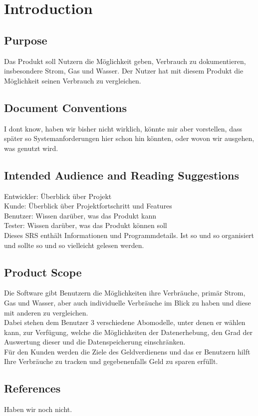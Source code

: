 \section{Introduction}
\subsection{Purpose}
Das Produkt soll Nutzern die Möglichkeit geben, Verbrauch zu dokumentieren, insbesondere Strom, Gas und Wasser. Der Nutzer hat mit diesem Produkt die Möglichkeit seinen Verbrauch zu vergleichen.
\subsection{Document Conventions}
I dont know, haben wir bisher nicht wirklich, könnte mir aber vorstellen, dass später so Systemanforderungen hier schon hin könnten, oder wovon wir ausgehen, was genutzt wird.
\subsection{Intended Audience and Reading Suggestions}
Entwickler: Überblick über Projekt\\
Kunde: Überblick über Projektfortschritt und Features\\
Benutzer: Wissen darüber, was das Produkt kann\\
Tester:  Wissen darüber, was das Produkt können soll\\
Dieses SRS enthält Informationen und Programmdetails.
Ist so und so organisiert und sollte so und so vielleicht gelesen werden.
\subsection{Product Scope}
Die Software gibt Benutzern die Möglichkeiten ihre Verbräuche, primär Strom, Gas und Wasser, aber auch individuelle Verbräuche im Blick zu haben und diese mit anderen zu vergleichen.\\
Dabei stehen dem Benutzer 3 verschiedene Abomodelle, unter denen er wählen kann, zur Verfügung, welche die Möglichkeiten der Datenerhebung, den Grad der Auswertung dieser und die Datenspeicherung einschränken.\\
Für den Kunden werden die Ziele des Geldverdienens und das er Benutzern hilft Ihre Verbräuche zu tracken und gegebenenfalls Geld zu sparen erfüllt.
\subsection{References}
Haben wir noch nicht.